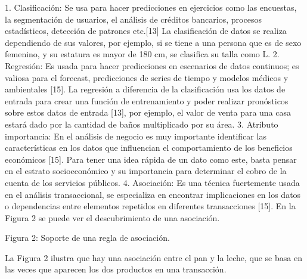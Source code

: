 1.	Clasificación: Se usa para hacer predicciones en ejercicios como las encuestas, la segmentación de usuarios, el análisis de créditos bancarios, procesos estadísticos, detección de patrones etc.[13] La clasificación de datos se realiza dependiendo de sus valores, por ejemplo, si se tiene a una persona que es de sexo femenino, y su estatura es mayor de 180 cm,  se clasifica su talla como L.
2.	Regresión: Es usada para hacer predicciones en escenarios de datos continuos; es valiosa para el forecast, predicciones de series de tiempo y modelos médicos y ambientales [15]. La regresión a diferencia de la clasificación usa los datos de entrada para crear una función de entrenamiento y poder realizar pronósticos sobre estos datos de entrada [13], por ejemplo, el valor de venta para una casa estará dado por la cantidad de baños multiplicado por su área.
3.	Atributo importancia: En el análisis de negocio es muy importante identificar las características en los datos que influencian el comportamiento de los beneficios económicos [15]. Para tener una idea rápida de un dato como este, basta pensar en el estrato socioeconómico y su importancia para determinar el cobro de la cuenta de los servicios públicos.
4.	Asociación: Es una técnica fuertemente usada en el análisis transaccional, se especializa en encontrar implicaciones en los datos o dependencias entre elementos repetidos en diferentes transacciones [15]. En la Figura 2 se puede ver el descubrimiento de una asociación.


Figura 2: Soporte de una regla de asociación.

La Figura 2 ilustra que hay una asociación entre el pan y la leche, que se basa en las veces que aparecen los dos productos en una transacción.

